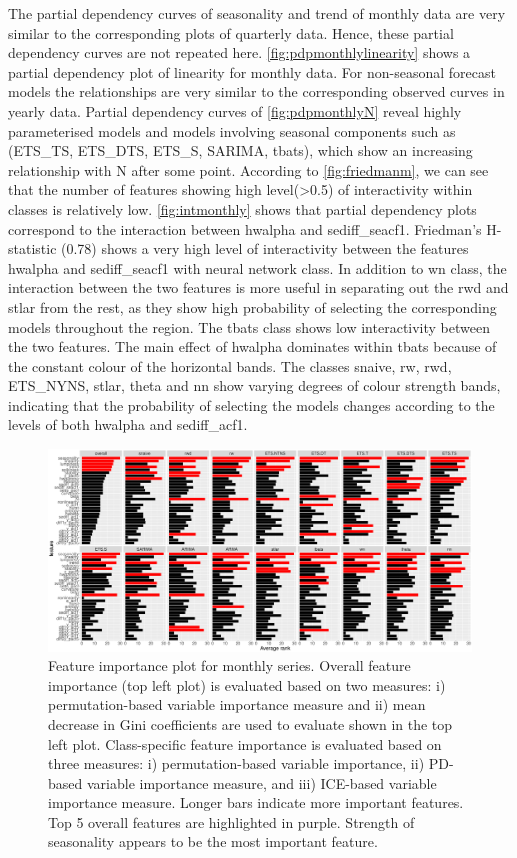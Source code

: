 \documentclass[11pt,a4paper,]{article}
\begin{document}
The partial dependency curves of seasonality and trend of monthly data are very similar to the corresponding plots of quarterly data. Hence, these partial dependency curves are not repeated here. \autoref{fig:pdpmonthlylinearity} shows a partial dependency plot of linearity for monthly data. For non-seasonal forecast models the relationships are very similar to the corresponding observed curves in yearly data. Partial dependency curves of \autoref{fig:pdpmonthlyN} reveal highly parameterised models and models involving seasonal components such as (ETS\_TS, ETS\_DTS, ETS\_S, SARIMA, tbats), which show an increasing relationship with N after some point. According to \autoref{fig:friedmanm}, we can see that the number of features showing high level(\textgreater{}0.5) of interactivity within classes is relatively low. \autoref{fig:intmonthly} shows that partial dependency plots correspond to the interaction between hwalpha and sediff\_seacf1. Friedman's H-statistic (0.78) shows a very high level of interactivity between the features hwalpha and sediff\_seacf1 with neural network class. In addition to wn class, the interaction between the two features is more useful in separating out the rwd and stlar from the rest, as they show high probability of selecting the corresponding models throughout the region. The tbats class shows low interactivity between the two features. The main effect of hwalpha dominates within tbats because of the constant colour of the horizontal bands. The classes snaive, rw, rwd, ETS\_NYNS, stlar, theta and nn show varying degrees of colour strength bands, indicating that the probability of selecting the models changes according to the levels of both hwalpha and sediff\_acf1.

\begin{figure}
\centering
\includegraphics{figures/vimonthly-1.pdf}
\caption{\label{fig:vimonthly}Feature importance plot for monthly series. Overall feature importance (top left plot) is evaluated based on two measures: i) permutation-based variable importance measure and ii) mean decrease in Gini coefficients are used to evaluate shown in the top left plot. Class-specific feature importance is evaluated based on three measures: i) permutation-based variable importance, ii) PD-based variable importance measure, and iii) ICE-based variable importance measure. Longer bars indicate more important features. Top 5 overall features are highlighted in purple. Strength of seasonality appears to be the most important feature.}
\end{figure}
\end{document}
